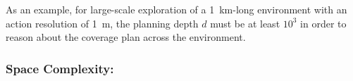 \documentclass[letterpaper]{article} %
\begin{document}
As an example, for large-scale exploration of a 1~km-long environment with an action resolution of 1~m, 
the planning depth $d$ must be at least $10^3$ in order to reason about the coverage plan across the environment.











\subsubsection{Space Complexity:} \hfill
\vspace{-0.25pt}
\end{document}
